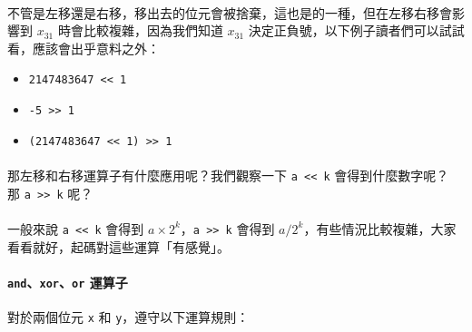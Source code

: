 \documentclass[12pt,a4paper,oneside]{article}
\begin{document}
\begin{CJK}{UTF8}{bkai}
\paragraph{}不管是左移還是右移，移出去的位元會被捨棄，這也是的一種，但在左移右移會影響到 $x_{31}$ 時會比較複雜，因為我們知道 $x_{31}$ 決定正負號，以下例子讀者們可以試試看，應該會出乎意料之外：
\begin{itemize}
\item \lstinline!2147483647 << 1!
\item \lstinline!-5 >> 1!
\item \lstinline!(2147483647 << 1) >> 1!
\end{itemize}

\paragraph{}那左移和右移運算子有什麼應用呢？我們觀察一下 \lstinline!a << k! 會得到什麼數字呢？ 那 \lstinline!a >> k! 呢？

\paragraph{}一般來說 \lstinline!a << k! 會得到 $a\times{2^k}$，\lstinline!a >> k! 會得到 $a / 2^k$，有些情況比較複雜，大家看看就好，起碼對這些運算「有感覺」。

\paragraph{\texttt{and}、\texttt{xor}、\texttt{or} 運算子}
    對於兩個位元 \lstinline!x! 和 \lstinline!y!，遵守以下運算規則：



\end{CJK}
\end{document}
